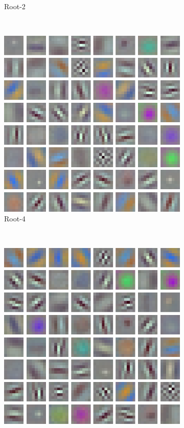\documentclass[thesis]{subfiles}
\begin{document}
\begin{figure}[tb]
\begin{subfigure}[b]{0.45\linewidth}
			\caption{Root-2}
			\label{fig:resnet50root2conv0}
		\end{subfigure}
		~
		\begin{subfigure}[b]{0.45\linewidth}
			\centering
			\includegraphics[width=\linewidth]{Figs/Raster/msrc-resnet-50-conv1-root8-convonly}
			\caption{Root-4}
			\label{fig:resnet50root4conv0}
		\end{subfigure}
		~
		\begin{subfigure}[b]{0.45\linewidth}
			\centering
			\includegraphics[width=\linewidth]{Figs/Raster/msrc-resnet-50-conv1-root16-convonly}

\end{subfigure}
\end{figure}
\end{document}
